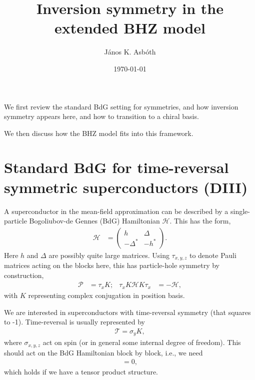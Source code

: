 \documentclass[aps,prb,twocolumn,showpacs,superscriptaddress,10p,longbibliography]{revtex4-1}
\newcommand{\Hbdg}{\mathcal{H}}
\begin{document}
\title{Inversion symmetry in the extended BHZ model} \author{J\'anos K. Asb\'oth}
\date{\today}

\begin{abstract}
  
\end{abstract}

\maketitle

We first review the standard BdG setting for symmetries, and how
inversion symmetry appears here, and how to transition to a chiral basis.

We then discuss how the BHZ model fits into this framework.

\section{Standard BdG for time-reversal symmetric superconductors (DIII)}

A superconductor in the mean-field approximation can be described by a
single-particle Bogoliubov-de Gennes (BdG) Hamiltonian $\Hbdg$. This
has the form, 
\begin{align}
  \Hbdg &= \begin{pmatrix} 
    h & \Delta \\ 
    -\Delta^\ast & -h^\ast \end{pmatrix}. 
\end{align}
Here $h$ and $\Delta$ are possibly quite large matrices. 
Using $\tau_{x,y,z}$ to denote Pauli matrices acting on the blocks
here, this has particle-hole symmetry by construction,
\begin{align}
  \mathcal{P} &= \tau_x K; &
  \tau_x K \Hbdg K \tau_x &= -\Hbdg,
\end{align}
with $K$ representing complex conjugation in position basis. 

We are interested in superconductors with time-reversal symmetry (that
squares to -1). Time-reversal is usually represented by
\begin{align}
  \mathcal{T} = \sigma_y K,
\end{align}
where $\sigma_{x,y,z}$ act on spin (or in general some internal degree
of freedom). This should act on the BdG Hamiltonian block by block,
i.e., we need
\begin{align}
  [\sigma_y,\tau_x] = 0,
\end{align}
which holds if we have a tensor product structure.
\end{document}
